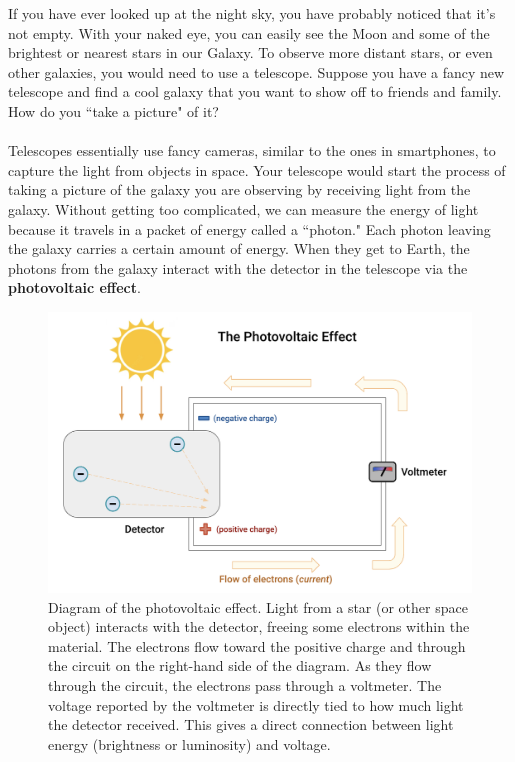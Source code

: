 \documentclass[14pt]{article}
\begin{document}
If you have ever looked up at the night sky, you have probably noticed that it's not empty. With your naked eye, you can easily see the Moon and some of the brightest or nearest stars in our Galaxy. To observe more distant stars, or even other galaxies, you would need to use a telescope. Suppose you have a fancy new telescope and find a cool galaxy that you want to show off to friends and family. How do you ``take a picture" of it?
\\\\
Telescopes essentially use fancy cameras, similar to the ones in smartphones, to capture the light from objects in space. Your telescope would start the process of taking a picture of the galaxy you are observing by receiving light from the galaxy. Without getting too complicated, we can measure the energy of light because it travels in a packet of energy called a ``photon." Each photon leaving the galaxy carries a certain amount of energy. When they get to Earth, the photons from the galaxy interact with the detector in the telescope via the \textbf{photovoltaic effect}. 
\begin{figure}[hb!]
    \centering
    \includegraphics[width=.8\linewidth]{photovoltaic.png}
    \caption{Diagram of the photovoltaic effect. Light from a star (or other space object) interacts with the detector, freeing some electrons within the material. The electrons flow toward the positive charge and through the circuit on the right-hand side of the diagram. As they flow through the circuit, the electrons pass through a voltmeter. The voltage reported by the voltmeter is directly tied to how much light the detector received. This gives a direct connection between light energy (brightness or luminosity) and voltage.}
    \label{fig:photovoltaic}
\end{figure}
\\\\
\end{document}
